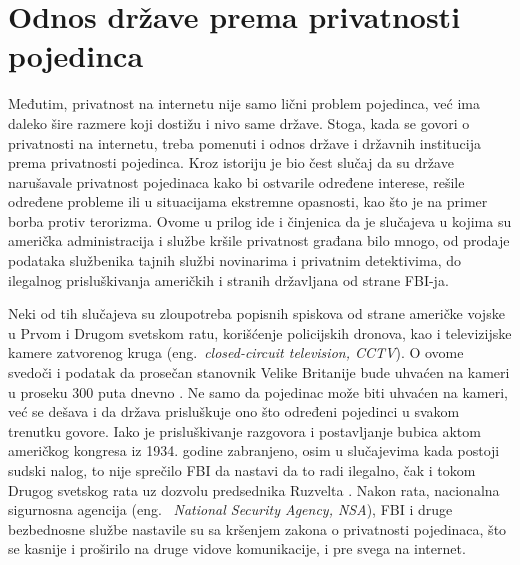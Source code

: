 \documentclass[a4paper]{article}
\begin{document}
\section{Odnos države prema privatnosti pojedinca}	
\label{sec:drugoPoglavlje}
\par Međutim, privatnost na internetu nije samo lični problem pojedinca, već ima daleko šire razmere koji dostižu i nivo same države. Stoga, kada se govori o privatnosti na internetu, treba pomenuti i odnos države i državnih institucija prema privatnosti pojedinca. Kroz istoriju je bio čest slučaj da su države narušavale  privatnost pojedinaca kako bi ostvarile određene interese, rešile određene probleme ili u situacijama ekstremne opasnosti, kao što je na primer borba protiv terorizma. Ovome u prilog ide i činjenica da je slučajeva u kojima su američka administracija i službe kršile privatnost građana bilo mnogo, od prodaje podataka službenika tajnih službi novinarima i privatnim detektivima, do ilegalnog prisluškivanja američkih i stranih državljana od strane FBI-ja.
\par Neki od tih slučajeva su zloupotreba popisnih spiskova od strane američke vojske u Prvom i Drugom svetskom ratu, korišćenje policijskih dronova, kao i televizijske kamere zatvorenog kruga (eng.~{\em closed-circuit television, CCTV}). O ovome svedoči i podatak da prosečan stanovnik Velike Britanije bude uhvaćen na kameri u proseku 300 puta dnevno \cite{ethics, london}. Ne samo da pojedinac može biti uhvaćen na kameri, već se dešava i da država prisluškuje ono što određeni pojedinci u svakom trenutku govore. Iako je prisluškivanje razgovora i postavljanje bubica aktom američkog kongresa iz 1934. godine zabranjeno, osim u slučajevima kada postoji sudski nalog, to nije sprečilo FBI da nastavi da to radi ilegalno, čak i tokom Drugog svetskog rata uz dozvolu predsednika Ruzvelta \cite{ruzvelt}. Nakon rata, nacionalna sigurnosna agencija (eng. ~{\em National Security Agency, NSA}), FBI i druge bezbednosne službe nastavile su sa kršenjem zakona o privatnosti pojedinaca, što se kasnije i proširilo na druge vidove komunikacije, i pre svega na internet.
\end{document}
